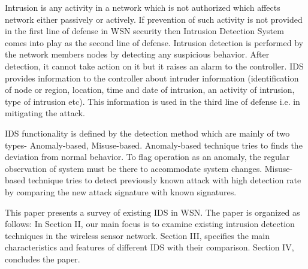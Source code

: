 \documentclass{svproc}
\begin{document}
Intrusion is any activity in a network which is not authorized which affects network either passively or actively. If prevention of such activity is not provided in the first line of defense in WSN security then Intrusion Detection System comes into play as the second line of defense. Intrusion detection is performed by the network members nodes by detecting any suspicious behavior. After detection, it cannot take action on it but it raises an alarm to the controller. IDS provides information to the controller about intruder information (identification of node or region, location, time and date of intrusion, an activity of intrusion, type of intrusion etc). This information is used in the third line of defense i.e. in mitigating the attack.\par
IDS functionality is defined by the detection method which are mainly of two types- Anomaly-based, Misuse-based. Anomaly-based technique tries to finds the deviation from normal behavior. To flag operation as an anomaly, the regular observation of system must be there to accommodate system changes. Misuse-based technique tries to detect previously known attack with high detection rate by comparing the new attack signature with known signatures.
\par
This paper presents a survey of existing IDS in WSN. The paper is organized as follows: In Section II, our main focus is to examine existing intrusion detection techniques in the wireless sensor network. Section III, specifies the main characteristics and features of different IDS with their comparison. Section IV, concludes the paper.
\end{document}
